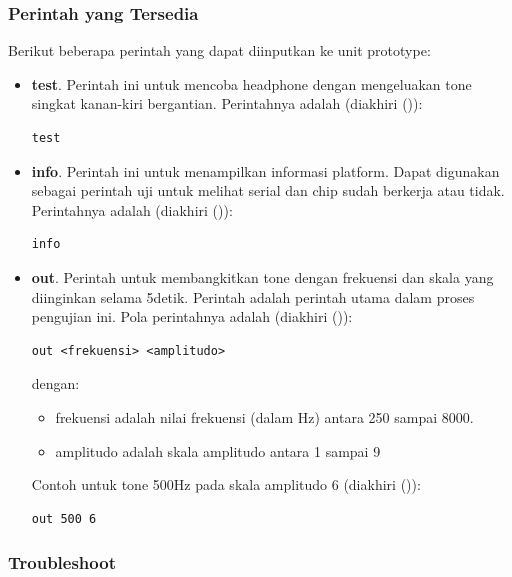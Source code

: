 \documentclass[12pt,]{article}
\begin{document}
	\subsubsection{Perintah yang Tersedia}
	
	Berikut beberapa perintah yang dapat diinputkan ke unit prototype:
	
	\begin{itemize}
		\item \textbf{test}.
		Perintah ini untuk mencoba headphone dengan mengeluakan tone singkat kanan-kiri bergantian.
		Perintahnya adalah (diakhiri (\keys{\return})):
		\begin{verbatim}
test
		\end{verbatim}
		
		\item \textbf{info}.
		Perintah ini untuk menampilkan informasi platform.
		Dapat digunakan sebagai perintah uji untuk melihat serial dan chip sudah berkerja atau tidak.
		Perintahnya adalah (diakhiri (\keys{\return})):
		\begin{verbatim}
info
		\end{verbatim}
		
		\item \textbf{out}.
		Perintah untuk membangkitkan tone dengan frekuensi dan skala yang diinginkan selama 5detik.
		Perintah adalah perintah utama dalam proses pengujian ini.
		Pola perintahnya adalah (diakhiri (\keys{\return})):
		\begin{verbatim}
out <frekuensi> <amplitudo>
		\end{verbatim}
		dengan:
		\begin{itemize}
			\item frekuensi adalah nilai frekuensi (dalam Hz) antara 250 sampai 8000.
			\item amplitudo adalah skala amplitudo antara 1 sampai 9
		\end{itemize}
		Contoh untuk tone 500Hz pada skala amplitudo 6 (diakhiri (\keys{\return})):
		\begin{verbatim}
out 500 6
		\end{verbatim}
	\end{itemize}
	
	\newpage
	\subsubsection{Troubleshoot}
	
\end{document}
